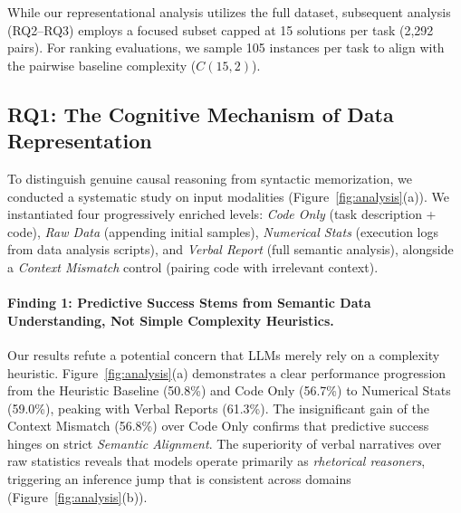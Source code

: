 While our representational analysis utilizes the full dataset, subsequent analysis (RQ2--RQ3) employs a focused subset capped at 15 solutions per task (2,292 pairs).
For ranking evaluations, we sample 105 instances per task to align with the pairwise baseline complexity ($C(15,2)$).

\subsection{RQ1: The Cognitive Mechanism of Data Representation}
\label{subsec:rq1_representation}

To distinguish genuine causal reasoning from syntactic memorization, we conducted a systematic study on input modalities (Figure~\ref{fig:analysis}(a)).
We instantiated four progressively enriched levels: \textit{Code Only} (task description + code), \textit{Raw Data} (appending initial samples), \textit{Numerical Stats} (execution logs from data analysis scripts), and \textit{Verbal Report} (full semantic analysis), alongside a \textit{Context Mismatch} control (pairing code with irrelevant context).

\paragraph{Finding 1: Predictive Success Stems from Semantic Data Understanding, Not Simple Complexity Heuristics.}
Our results refute a potential concern that LLMs merely rely on a complexity heuristic.
Figure~\ref{fig:analysis}(a) demonstrates a clear performance progression from the Heuristic Baseline (50.8\%) and Code Only (56.7\%) to Numerical Stats (59.0\%), peaking with Verbal Reports (61.3\%).
The insignificant gain of the Context Mismatch (56.8\%) over Code Only confirms that predictive success hinges on strict \textit{Semantic Alignment}.
The superiority of verbal narratives over raw statistics reveals that models operate primarily as \textit{rhetorical reasoners}, triggering an inference jump that is consistent across domains (Figure~\ref{fig:analysis}(b)).


